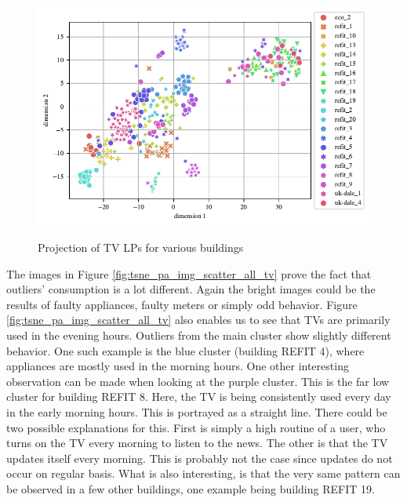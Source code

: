 \begin{figure}[H]
	\centering
	\caption{Projection of TV LPs for various buildings}
	\includegraphics[]{Figures/TSNE/TSNE_per_appliance/scatter_refit_television.pdf}
	\label{fig:tsne_pa_scatter_all_tv}
\end{figure}

The images in Figure \ref{fig:tsne_pa_img_scatter_all_tv} prove the fact that outliers' consumption is a lot different.
Again the bright images could be the results of faulty appliances, faulty meters or simply odd behavior.
Figure \ref{fig:tsne_pa_img_scatter_all_tv} also enables us to see that TVs are primarily used 
in the evening hours. Outliers from the main cluster show slightly different behavior. One such 
example is the blue cluster (building REFIT 4), where appliances are mostly used in the morning hours. 
One other interesting observation can be made when looking at the purple cluster. This is the far low cluster for building REFIT 8.
Here, the TV is being consistently used every day in the early morning hours.
This is portrayed as a straight line.
There could be two possible explanations for this.
First is simply a high routine of a user, who turns on the TV every morning to listen to the news.
The other is that the TV updates itself every morning. This is probably not the case since updates do not occur on regular basis.
What is also interesting, is that the very same pattern can be observed in a few other buildings, one example being building REFIT 19.

